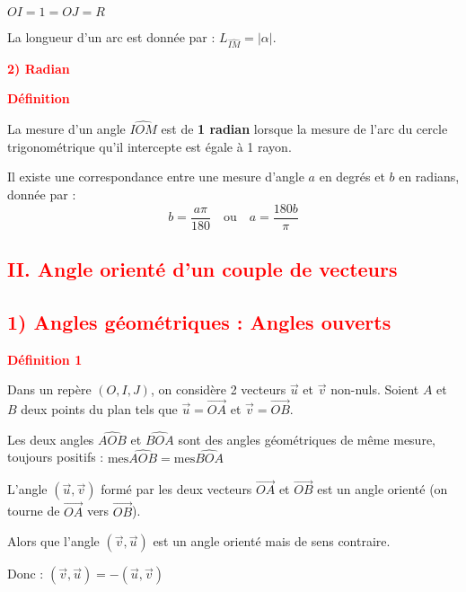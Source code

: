 \documentclass{article}
\begin{document}
$OI = 1 = OJ = R$

La longueur d’un arc est donnée par :  $L_{\widehat{IM}} = | \alpha |$.

\textcolor{red}{\textbf{2) Radian}}  

\textcolor{red}{\textbf{ Définition}} 

La mesure d'un angle $\widehat{IOM}$ est de \textbf{1 radian} lorsque la mesure de l'arc du cercle trigonométrique qu'il intercepte est égale à 1 rayon.

Il existe une correspondance entre une mesure d'angle $a$ en degrés et $b$ en radians, donnée par :  
\[
b = \frac{a \pi}{180} \quad \text{ou} \quad a = \frac{180b}{\pi}
\]

\subsection*{\textcolor{red}{\textbf{II. Angle orienté d’un couple de vecteurs}}}

\subsection*{\textcolor{red}{\textbf{1) Angles géométriques : Angles ouverts}}}

\textcolor{red}{\textbf{ Définition 1}}

Dans un repère $(O, I, J)$, on considère 2 vecteurs $\overrightarrow{u}$ et $\overrightarrow{v}$ non-nuls.  
Soient $A$ et $B$ deux points du plan tels que $\overrightarrow{u} = \overrightarrow{OA}$ et $\overrightarrow{v} = \overrightarrow{OB}$.  

Les deux angles $\widehat{AOB}$ et $\widehat{BOA}$ sont des angles géométriques de même mesure, toujours positifs : $\text{mes} \widehat{AOB} = \text{mes} \widehat{BOA}$

L’angle $(\overrightarrow{u}, \overrightarrow{v})$ formé par les deux vecteurs $\overrightarrow{OA}$ et $\overrightarrow{OB}$ est un angle orienté (on tourne de $\overrightarrow{OA}$ vers $\overrightarrow{OB}$).  

Alors que l’angle $(\overrightarrow{v}, \overrightarrow{u})$ est un angle orienté mais de sens contraire.  

Donc : $(\overrightarrow{v}, \overrightarrow{u}) = -(\overrightarrow{u}, \overrightarrow{v})$

\begin{center}
\end{center}
\end{document}
